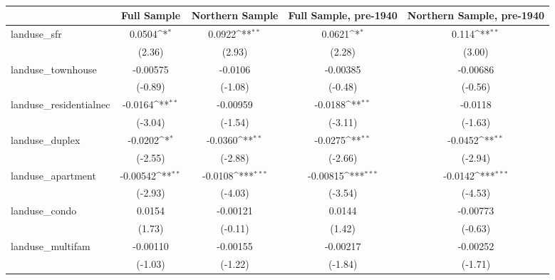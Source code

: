 \begin{table}[htbp]\centering
\def\sym#1{\ifmmode^{#1}\else\(^{#1}\)\fi}
\caption{ \label{tab1}}
\begin{tabular}{l*{4}{c}}
\toprule
                    &\multicolumn{1}{c}{Full Sample}&\multicolumn{1}{c}{Northern Sample}&\multicolumn{1}{c}{Full Sample, pre-1940}&\multicolumn{1}{c}{Northern Sample, pre-1940}\\
\midrule
landuse\_sfr         &      0.0504\sym{*}  &      0.0922\sym{**} &      0.0621\sym{*}  &       0.114\sym{**} \\
                    &      (2.36)         &      (2.93)         &      (2.28)         &      (3.00)         \\
\addlinespace
landuse\_townhouse   &    -0.00575         &     -0.0106         &    -0.00385         &    -0.00686         \\
                    &     (-0.89)         &     (-1.08)         &     (-0.48)         &     (-0.56)         \\
\addlinespace
landuse\_residentialnec&     -0.0164\sym{**} &    -0.00959         &     -0.0188\sym{**} &     -0.0118         \\
                    &     (-3.04)         &     (-1.54)         &     (-3.11)         &     (-1.63)         \\
\addlinespace
landuse\_duplex      &     -0.0202\sym{*}  &     -0.0360\sym{**} &     -0.0275\sym{**} &     -0.0452\sym{**} \\
                    &     (-2.55)         &     (-2.88)         &     (-2.66)         &     (-2.94)         \\
\addlinespace
landuse\_apartment   &    -0.00542\sym{**} &     -0.0108\sym{***}&    -0.00815\sym{***}&     -0.0142\sym{***}\\
                    &     (-2.93)         &     (-4.03)         &     (-3.54)         &     (-4.53)         \\
\addlinespace
landuse\_condo       &      0.0154         &    -0.00121         &      0.0144         &    -0.00773         \\
                    &      (1.73)         &     (-0.11)         &      (1.42)         &     (-0.63)         \\
\addlinespace
landuse\_multifam    &    -0.00110         &    -0.00155         &    -0.00217         &    -0.00252         \\
                    &     (-1.03)         &     (-1.22)         &     (-1.84)         &     (-1.71)         \\

\end{tabular}
\end{table}
